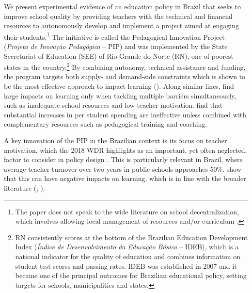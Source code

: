 \documentclass[11pt,a4paper]{article}
\begin{document}
We present experimental evidence of an education policy in Brazil that seeks to improve school quality by providing teachers with the technical and financial resources to autonomously develop and implement a project aimed at engaging their students.\footnote{The paper does not speak to the wide literature on school decentralization, which involves allowing local management of resources and/or curriculum \citep{hanushek2013does}.} The initiative is called the Pedagogical Innovation Project (\textit{Projeto de Inovação Pedagógica} -- PIP) and was implemented by the State Secretariat of Education (SEE) of Rio Grande do Norte (RN), one of poorest states in the country.\footnote{RN consistently scores at the bottom of the Brazilian Education Development Index (\textit{Índice de Desenvolvimento da Educação Básica} -- IDEB), which is a national indicator for the quality of education and combines information on student test scores and passing rates. IDEB was established in 2007 and it became one of the principal outcomes for Brazilian educational policy, setting targets for schools, municipalities and states.} By combining autonomy, technical assistance and funding, the program targets both supply- and demand-side constraints which is shown to be the most effective approach to impact learning (\citealp{SystematicReview}). Along similar lines, \cite{mbiti2019inputs} find large impacts on learning only when tackling multiple barriers simultaneously, such as inadequate school resources and low teacher motivation. \cite{andrew2019preschool} find that substantial increases in per student spending are ineffective unless combined with complementary resources such as pedagogical training and coaching.


A key innovation of the PIP in the Brazilian context is its focus on teacher motivation, which the 2018 WDR highlights as an important, yet often neglected, factor to consider in policy design \citep{WDR2018}. This is particularly relevant in Brazil, where average teacher turnover over two years in public schools approaches 50\%. \cite{akhtari2018political} show that this can have negative impacts on learning, which is in line with the broader literature (\citealp{ronfeldt2013teacher}; \citealp{jackson2014teacher}).

\end{document}
